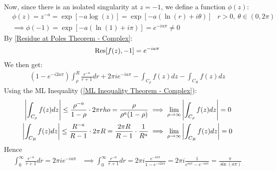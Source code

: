 \documentclass[12pt, english]{book}
\makeatletter
\renewenvironment{proof}[1][\proofname]{\par
	\pushQED{\qed}%
	\normalfont \topsep6\p@\@plus6\p@\relax
	\list{}{%
		\settowidth{\leftmargin}{\itshape\proofname:\hskip\labelsep}%
		\setlength{\labelwidth}{0pt}%
		\setlength{\itemindent}{-\leftmargin}%
	}%
	\item[\hskip\labelsep\itshape#1\@addpunct{:}]\ignorespaces
}{%
	\popQED\endlist\@endpefalse
}
\makeatother
\begin{document}
\begin{example}
\begin{proof}
			Now, since there is an isolated singularity at \(z=-1\), we define a function \(\phi(z)\):
			\begin{align*}
				&\phi(z) = z^{-a} = \exp[-a\log(z)] = \exp[-a(\ln(r) + i \theta)]
					& r>0, \ \theta \in (0, 2\pi) \\
				&\implies \phi(-1) = \exp[-a(\ln(1) + i\pi)] = e^{-ia\pi} \neq 0
			\end{align*}
			By \cref{Residue at Poles Theorem - Complex}:
			\begin{align*}
				\Res[f(z), -1] = e^{-ia\pi}
			\end{align*}
			We then get:
			\begin{align*}
				(1-e^{-i2a\pi}) \int_{\rho}^{R} \frac{r^{-a}}{r+1} dr + 2\pi i e^{-ia\pi}
					- \int_{C_\rho} f(z) dz - \int_{C_R} f(z) dz
			\end{align*}
		 	Using the ML Inequality (\cref{ML Inequality Theorem - Complex}):
		 	\begin{align*}
		 		\abs{\int_{C_\rho} f(z) dz} 
		 		\leq \frac{\rho^{-a}}{1-\rho} \cdot 2\pi rho = \frac{\rho}{\rho^a(1-\rho)}
		 		&\implies \lim_{\rho \rightarrow \infty} \abs{\int_{C_\rho} f(z) dz}  = 0 \\
		 		\abs{\int_{C_R} f(z) dz} 
		 		\leq \frac{R^{-a}}{R-1} \cdot 2\pi R = \frac{2\pi R}{R-1} \cdot \frac{1}{R^a}
		 		&\implies \lim_{\rho \rightarrow \infty} \abs{\int_{C_R} f(z) dz}  = 0 
		 	\end{align*}
	 		Hence
	 		\begin{align*}
	 			\int_{0}^{\infty} \frac{r^{-a}}{r+1} dr = 2\pi i e^{-ia\pi}
	 			&\implies \int_{0}^{\infty} \frac{r^{-a}}{r+1} dr 
	 				= 2\pi i \frac{e^{-ia\pi}}{1-e^{-i2a\pi}} 
	 				= 2\pi i \frac{1}{e^{ia\pi} - e^{-ia\pi}}
	 				= \frac{\pi}{\sin(a\pi)}
	 		\end{align*}
		\end{proof}
	\end{example}
\end{document}
